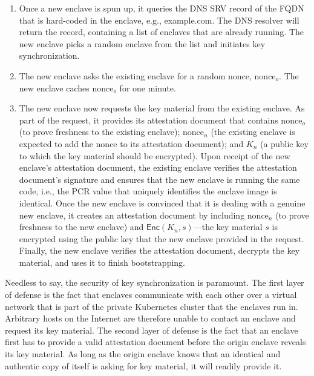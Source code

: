 \begin{enumerate}

  \item Once a new enclave is spun up, it queries the DNS SRV record of the FQDN
    that is hard-coded in the enclave, e.g., example.com.  The DNS resolver will
    return the record, containing a list of enclaves that are already running.
    The new enclave picks a random enclave from the list and initiates key
    synchronization.

  \item The new enclave asks the existing enclave for a random nonce,
    $\textrm{nonce}_o$.  The new enclave caches $\textrm{nonce}_o$ for one
    minute.

  \item The new enclave now requests the key material from the existing enclave.
    As part of the request, it provides its attestation document that contains
    $\textrm{nonce}_o$ (to prove freshness to the existing enclave);
    $\textrm{nonce}_n$ (the existing enclave is expected to add the nonce to its
    attestation document); and $K_n$ (a public key to which the key material
    should be encrypted).  Upon receipt of the new enclave's attestation
    document, the existing enclave verifies the attestation document's signature
    and ensures that the new enclave is running the same code, i.e., the PCR
    value that uniquely identifies the enclave image is identical.  Once the new
    enclave is convinced that it is dealing with a genuine new enclave, it
    creates an attestation document by including $\textrm{nonce}_n$ (to prove
    freshness to the new enclave) and $\textsf{Enc}(K_n, s)$---the key material
    $s$ is encrypted using the public key that the new enclave provided in the
    request.  Finally, the new enclave verifies the attestation document,
    decrypts the key material, and uses it to finish bootstrapping.

\end{enumerate}

Needless to say, the security of key synchronization is paramount.  The first
layer of defense is the fact that enclaves communicate with each other over a
virtual network that is part of the private Kubernetes cluster that the enclaves
run in.  Arbitrary hosts on the Internet are therefore unable to contact an
enclave and request its key material.  The second layer of defense is the fact
that an enclave first has to provide a valid attestation document before the
origin enclave reveals its key material.  As long as the origin enclave knows
that an identical and authentic copy of itself is asking for key material, it
will readily provide it.

